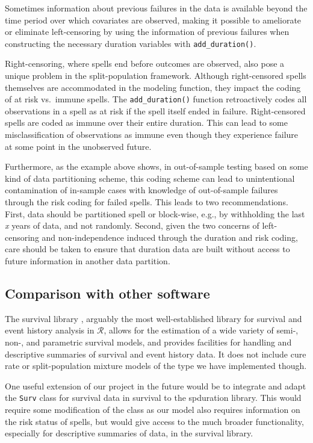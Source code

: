 \documentclass[12pt,onesided]{amsart}
\newcommand{\pkg}[1]{{\fontseries{b}\selectfont #1}}
\begin{document}
Sometimes information about previous failures in the data is available
beyond the time period over which covariates are observed, making it
possible to ameliorate or eliminate left-censoring by using the
information of previous failures when constructing the necessary
duration variables with \verb|add_duration()|.

Right-censoring, where spells end before outcomes are observed, also
pose a unique problem in the split-population framework. Although
right-censored spells themselves are accommodated in the modeling
function, they impact the coding of at risk vs.~immune spells. The
\verb|add_duration()| function retroactively codes all observations in
a spell as at risk if the spell itself ended in failure. Right-censored
spells are coded as immune over their entire duration. This can lead to
some misclassification of observations as immune even though they
experience failure at some point in the unobserved future.

Furthermore, as the example above shows, in out-of-sample testing based
on some kind of data partitioning scheme, this coding scheme can lead to
unintentional contamination of in-sample cases with knowledge of
out-of-sample failures through the risk coding for failed spells. This
leads to two recommendations. First, data should be partitioned spell or
block-wise, e.g., by withholding the last \emph{x} years of data, and
not randomly. Second, given the two concerns of left-censoring and
non-independence induced through the duration and risk coding, care
should be taken to ensure that duration data are built without access to
future information in another data partition.

\subsection{Comparison with other software}

The \pkg{survival} library \citep{thernau2000modeling, thernau2015survival}, arguably the most well-established library for survival and event history analysis in $\mathcal{R}$, allows for the estimation of a wide variety of semi-, non-, and parametric survival models, and provides facilities for handling and descriptive summaries of survival and event history data. It does not include cure rate or split-population mixture models of the type we have implemented though.

One useful extension of our project in the future would be to integrate and adapt the \texttt{Surv} class for survival data in \pkg{survival} to the \pkg{spduration} library. This would require some modification of the class as our model also requires information on the risk status of spells, but would give access to the much broader functionality, especially for descriptive summaries of data, in the \pkg{survival} library. 
\end{document}
